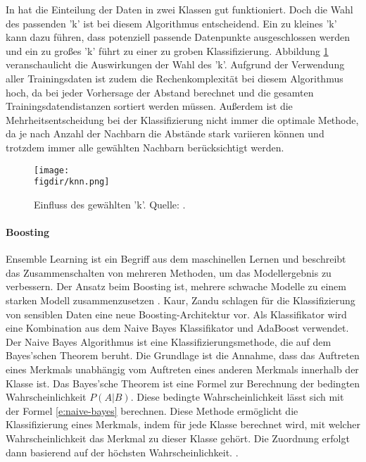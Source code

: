In \cite{Zardari.2014} hat die Einteilung der Daten in zwei Klassen gut funktioniert. Doch die Wahl des passenden 'k' ist bei diesem Algorithmus entscheidend. Ein zu kleines 'k' kann dazu führen, dass potenziell passende Datenpunkte ausgeschlossen werden und ein zu großes 'k' führt zu einer zu groben Klassifizierung. Abbildung \ref{f:knn} veranschaulicht die Auswirkungen der Wahl des 'k'. Aufgrund der Verwendung aller Trainingsdaten ist zudem die Rechenkomplexität bei diesem Algorithmus hoch, da bei jeder Vorhersage der Abstand berechnet und die gesamten Trainingsdatendistanzen sortiert werden müssen. Außerdem ist die Mehrheitsentscheidung bei der Klassifizierung nicht immer die optimale Methode, da je nach Anzahl der Nachbarn die Abstände stark variieren können und trotzdem immer alle gewählten Nachbarn berücksichtigt werden.

\begin{figure}[htbp]
    \centering
    \texttt{[image: \\figdir/knn.png]}
    \caption{Einfluss des gewählten 'k'. Quelle: \cite{Shah.03.03.2021}.}
    \label{f:knn}
\end{figure}


\paragraph{Boosting}
Ensemble Learning ist ein Begriff aus dem maschinellen Lernen und beschreibt das Zusammenschalten von mehreren Methoden, um das Modellergebnis zu verbessern. Der Ansatz beim Boosting ist, mehrere schwache Modelle zu einem starken Modell zusammenzusetzen \cite{Frochte.2018c}.
Kaur, Zandu \cite{Kaur.2016} schlagen für die Klassifizierung von sensiblen Daten eine neue Boosting-Architektur vor. Als Klassifikator wird eine Kombination aus dem Naive Bayes Klassifikator und AdaBoost verwendet. Der Naive Bayes Algorithmus ist eine Klassifizierungsmethode, die auf dem  Bayes'schen Theorem beruht. Die Grundlage ist die Annahme, dass das Auftreten eines Merkmals unabhängig vom Auftreten eines anderen Merkmals innerhalb der Klasse ist. Das  Bayes'sche Theorem ist eine Formel zur Berechnung der bedingten Wahrscheinlichkeit ${P(A|B)}$. Diese bedingte Wahrscheinlichkeit lässt sich mit der Formel \ref{e:naive-bayes} berechnen. Diese Methode ermöglicht die Klassifizierung eines Merkmals, indem für jede Klasse berechnet wird, mit welcher Wahrscheinlichkeit das Merkmal zu dieser Klasse gehört. Die Zuordnung erfolgt dann basierend auf der höchsten Wahrscheinlichkeit. \cite{Frochte.2018d}.

